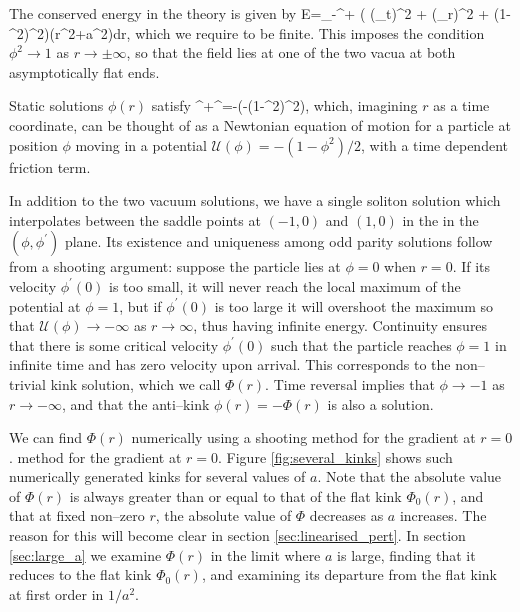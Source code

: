 The conserved energy in the theory is given by
\be
\nonumber
E=\int_{-\infty}^{+\infty} \bigg(  (\phi_t)^2 +  (\phi_r)^2 + (1-\phi^2)^2\bigg)(r^2+a^2)dr,
\ee
which we require to be finite. This imposes the condition $\phi^2\rightarrow 1$ as $r\rightarrow\pm\infty$, so that the field lies at one of the two vacua at both asymptotically flat ends.

Static solutions $\phi(r)$ satisfy
\be
\label{eom.static}
\phi^{\prime\prime}+\phi^{\prime}=-\bigg(-(1-\phi^2)^2\bigg),
\ee
which, imagining $r$ as a time coordinate, can be thought of as a Newtonian equation of motion for a particle at position $\phi$ moving in a potential $\mathcal{U}(\phi)=-(1-\phi^2)/2$, with a time dependent friction term.

In addition to the two vacuum solutions, we have a single soliton solution which interpolates between the saddle points at $(-1,0)$ and $(1,0)$ in the in the $(\phi,\phi^\prime)$ plane. Its existence and uniqueness among odd parity solutions follow from a shooting argument: suppose the particle lies at $\phi=0$ when $r=0$. If its velocity $\phi^\prime(0)$ is too small, it will never reach the local maximum of the potential at $\phi=1$, but if $\phi^\prime(0)$ is too large it will overshoot the maximum so that $\mathcal{U}(\phi)\rightarrow -\infty$ as $r\rightarrow\infty$, thus having infinite energy. Continuity ensures that there is some critical velocity $\phi^\prime(0)$ such that the particle reaches $\phi=1$ in infinite time and has zero velocity upon arrival. This corresponds to the non--trivial kink solution, which we call $\Phi(r)$. Time reversal implies that $\phi\rightarrow -1$ as $r\rightarrow -\infty$, and that the anti--kink $\phi(r)=-\Phi(r)$ is also a solution.

We can find $\Phi(r)$ numerically using a shooting method for the gradient at $r=0$. %
method for the gradient at $r=0$. Figure \ref{fig:several_kinks} shows such numerically generated kinks for several values of $a$. Note that the absolute value of $\Phi(r)$ is always greater than or equal to that of the flat kink $\Phi_0(r)$, and that at fixed non--zero $r$, the absolute value of $\Phi$ decreases as $a$ increases. The reason for this will become clear in section \ref{sec:linearised_pert}. In section \ref{sec:large_a} we examine $\Phi(r)$ in the limit where $a$ is large, finding that it reduces to the flat kink $\Phi_0(r)$, and examining its departure from the flat kink at first order in $1/a^2$.

